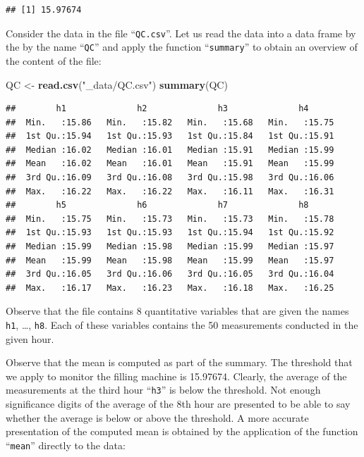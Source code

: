 \documentclass[
]{krantz}
\makeatletter
\newenvironment{Shaded}{\begin{snugshade}}{\end{snugshade}}
\newcommand{\KeywordTok}[1]{\textcolor[rgb]{0.13,0.29,0.53}{\textbf{#1}}}
\newcommand{\NormalTok}[1]{#1}
\newcommand{\StringTok}[1]{\textcolor[rgb]{0.31,0.60,0.02}{#1}}
\newenvironment{kframe}{%
\medskip{}
\setlength{\fboxsep}{.8em}
 \def\at@end@of@kframe{}%
 \ifinner\ifhmode%
  \def\at@end@of@kframe{\end{minipage}}%
  \begin{minipage}{\columnwidth}%
 \fi\fi%
 \def\FrameCommand##1{\hskip\@totalleftmargin \hskip-\fboxsep
 \colorbox{shadecolor}{##1}\hskip-\fboxsep
     \hskip-\linewidth \hskip-\@totalleftmargin \hskip\columnwidth}%
 \MakeFramed {\advance\hsize-\width
   \@totalleftmargin\z@ \linewidth\hsize
   \@setminipage}}%
 {\par\unskip\endMakeFramed%
 \at@end@of@kframe}
\renewenvironment{Shaded}{\begin{kframe}}{\end{kframe}}
\theoremstyle{definition}
\theoremstyle{definition}
\theoremstyle{definition}
\theoremstyle{remark}
\makeatother
\begin{document}
\begin{verbatim}
## [1] 15.97674
\end{verbatim}

Consider the data in the file ``\texttt{QC.csv}''. Let us read the data into a
data frame by the by the name ``\texttt{QC}'' and apply the function ``\texttt{summary}''
to obtain an overview of the content of the file:

\begin{Shaded}
\begin{Highlighting}[]
\NormalTok{QC <-}\StringTok{ }\KeywordTok{read.csv}\NormalTok{(}\StringTok{"_data/QC.csv"}\NormalTok{)}
\KeywordTok{summary}\NormalTok{(QC)}
\end{Highlighting}
\end{Shaded}

\begin{verbatim}
##        h1              h2              h3              h4       
##  Min.   :15.86   Min.   :15.82   Min.   :15.68   Min.   :15.75  
##  1st Qu.:15.94   1st Qu.:15.93   1st Qu.:15.84   1st Qu.:15.91  
##  Median :16.02   Median :16.01   Median :15.91   Median :15.99  
##  Mean   :16.02   Mean   :16.01   Mean   :15.91   Mean   :15.99  
##  3rd Qu.:16.09   3rd Qu.:16.08   3rd Qu.:15.98   3rd Qu.:16.06  
##  Max.   :16.22   Max.   :16.22   Max.   :16.11   Max.   :16.31  
##        h5              h6              h7              h8       
##  Min.   :15.75   Min.   :15.73   Min.   :15.73   Min.   :15.78  
##  1st Qu.:15.93   1st Qu.:15.93   1st Qu.:15.94   1st Qu.:15.92  
##  Median :15.99   Median :15.98   Median :15.99   Median :15.97  
##  Mean   :15.99   Mean   :15.98   Mean   :15.99   Mean   :15.97  
##  3rd Qu.:16.05   3rd Qu.:16.06   3rd Qu.:16.05   3rd Qu.:16.04  
##  Max.   :16.17   Max.   :16.23   Max.   :16.18   Max.   :16.25
\end{verbatim}

Observe that the file contains 8 quantitative variables that are given
the names \texttt{h1}, \ldots{}, \texttt{h8}. Each of these variables contains the 50
measurements conducted in the given hour.

Observe that the mean is computed as part of the summary. The threshold
that we apply to monitor the filling machine is 15.97674. Clearly, the
average of the measurements at the third hour ``\texttt{h3}'' is below the
threshold. Not enough significance digits of the average of the 8th hour
are presented to be able to say whether the average is below or above
the threshold. A more accurate presentation of the computed mean is
obtained by the application of the function ``\texttt{mean}'' directly to the
data:
\end{document}
